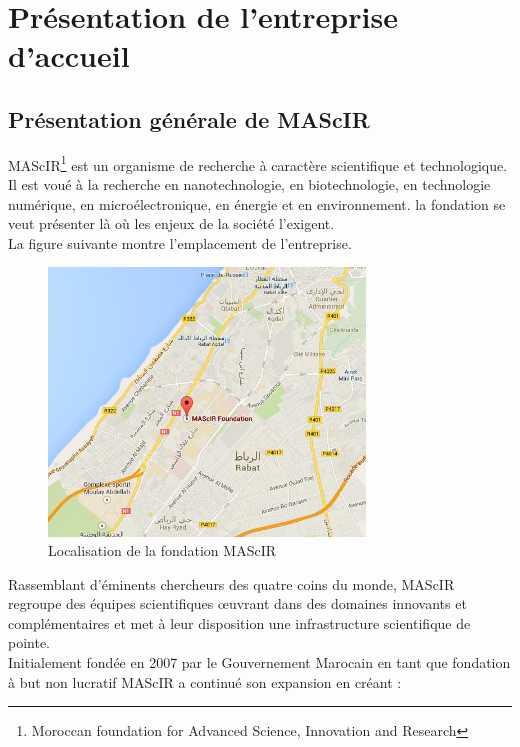 \documentclass[11pt, a4paper, twoside]{book}
\begin{document}
\pagestyle{plain}

\chapter{Présentation de l'entreprise d'accueil}
\pagestyle{headings}
\section{Présentation générale de MAScIR}
MAScIR\footnote{Moroccan foundation for Advanced Science, Innovation and Research} est un organisme de recherche à caractère scientifique et technologique. Il est voué à la recherche en nanotechnologie, en biotechnologie, en technologie numérique, en microélectronique, en énergie et en environnement. la fondation se veut présenter là où les enjeux de la société l’exigent.\\

La figure suivante montre l’emplacement de l’entreprise.

\begin{figure}[h]
\centering
\includegraphics[width=0.75\textwidth]{mascir_map}
\caption{Localisation de la fondation MAScIR}
\end{figure}

Rassemblant d’éminents chercheurs des quatre coins du monde, MAScIR regroupe des équipes scientifiques œuvrant dans des domaines innovants et complémentaires et met à leur disposition une infrastructure scientifique de pointe.\\

Initialement fondée en 2007 par le Gouvernement Marocain en tant que fondation à but non lucratif MAScIR a continué son expansion en créant :
\end{document}
